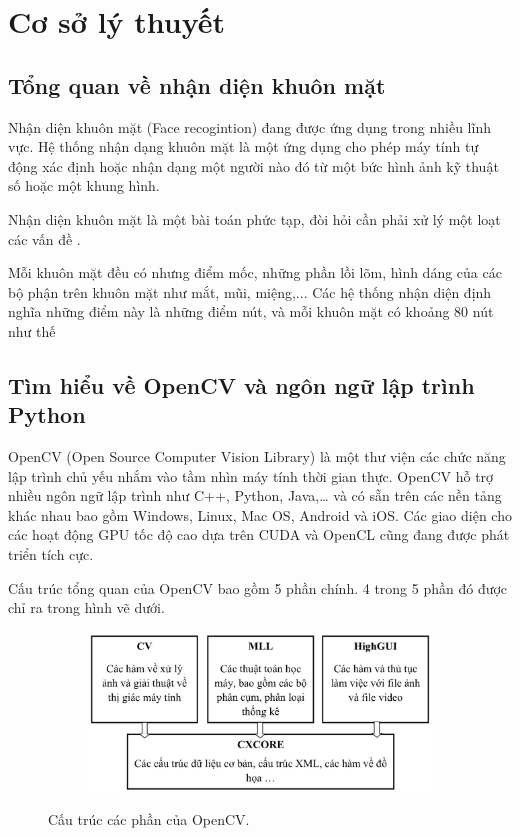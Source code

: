 \chapter{Cơ sở lý thuyết}
\label{cha:chap2}

\section{Tổng quan về nhận diện khuôn mặt}

Nhận diện khuôn mặt (Face recogintion) đang được ứng dụng trong nhiều lĩnh vực.
Hệ thống nhận dạng khuôn mặt là một ứng dụng cho phép máy tính tự động xác định
hoặc nhận dạng một người nào đó từ một bức hình ảnh kỹ thuật số hoặc một khung
hình.

Nhận diện khuôn mặt là một bài toán phức tạp, đòi hỏi cần phải xử lý một
loạt các vấn đề .

Mỗi khuôn mặt đều có nhưng điểm mốc, những phần lồi lõm, hình dáng của các
bộ phận trên khuôn mặt như mắt, mũi, miệng,... Các hệ thống nhận diện định
nghĩa những điểm này là những điểm nút, và mỗi khuôn mặt có khoảng 80 nút như thế


\section{Tìm hiểu về OpenCV và ngôn ngữ lập trình Python}

OpenCV (Open Source Computer Vision Library) là một thư viện các chức năng lập
trình chủ yếu nhắm vào tầm nhìn máy tính thời gian thực. OpenCV hỗ trợ nhiều ngôn
ngữ lập trình như C++, Python, Java,… và có sẵn trên các nền tảng khác nhau bao
gồm Windows, Linux, Mac OS, Android và iOS. Các giao diện cho các hoạt động
GPU tốc độ cao dựa trên CUDA và OpenCL cũng đang được phát triển tích cực.

Cấu trúc tổng quan của OpenCV bao gồm 5 phần chính. 4 trong 5 phần đó được chỉ ra
trong hình vẽ dưới.

\begin{figure}[t]
    \begin{subfigure}{0.7\textwidth}
        \includegraphics[width=0.99\linewidth]{Chapters/items/chap2_1.jpg}
        \caption{}
        \label{fig:chap2_1}
    \end{subfigure}
    \caption{Cấu trúc các phần của OpenCV.}
\end{figure}

